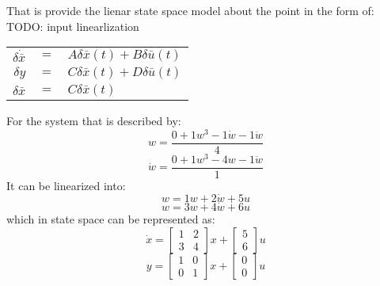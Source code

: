 \begin{enumerate}
  That is provide the lienar state space model about the point in the form of:
  {\LARGE \color{red} TODO: input linearlization}
  \begin{center}
    \begin{tabular}{r c l}
      $\delta \dot{\bar x}$ & $=$ & $A\delta\bar{x}(t) + B\delta\bar{u}(t)$\\
      $\delta y$ & $=$ & $C\delta\bar x(t) + D\delta\bar u(t)$\\
      $\delta \bar x$ & $=$ & $C\delta\bar x(t)$
    \end{tabular}
  \end{center}
  For the system that is described by:
  \begin{equation}
    w = \frac{0 + 1w^3 - 1\dot w - 1\ddot w}{4}
  \end{equation}
  \begin{equation}
    \dot w = \frac{0 + 1w^3 - 4w- 1\ddot w}{1}
  \end{equation}
  It can be linearized into:
  \begin{equation}
    w = 1w + 2\dot w + 5u
  \end{equation}
  \begin{equation}
    w = 3w + 4\dot w + 6u
  \end{equation}
  which in state space can be represented as:
  \begin{equation}
\dot x = \begin{bmatrix}
1 & 2\\
3 & 4
\end{bmatrix}
x + \begin{bmatrix}
5\\
6
\end{bmatrix}
u\end{equation}
\begin{equation}
y = \begin{bmatrix}
1 & 0\\
0 & 1
\end{bmatrix}
x + \begin{bmatrix}
0\\
0
\end{bmatrix}
u\end{equation}

\end{enumerate}
